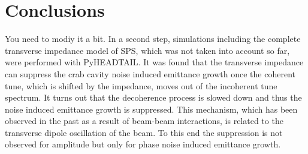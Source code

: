 \section{Conclusions}
You need to modiy it a bit.
In a second step, simulations including the complete transverse impedance model of SPS, which was not taken into account so far, were performed with PyHEADTAIL. It was found that the transverse impedance can suppress the crab cavity noise induced emittance growth once the coherent tune, which is shifted by the impedance, moves out of the incoherent tune spectrum. It turns out that the decoherence process is slowed down and thus the noise induced emittance growth is suppressed. This mechanism, which has been observed in the past as a result of beam-beam interactions, is related to the transverse dipole oscillation of the beam. To this end the suppression is not observed for amplitude but only for phase noise induced emittance growth.